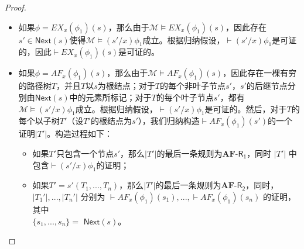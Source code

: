 \begin{proof}
\begin{itemize}
		\item 如果$\phi = EX_x(\phi_1)(s)$，那么由于$\mathcal{M}\models EX_x(\phi_1)(s)$，因此存在$s'\in \mathsf{Next}(s)$使得$\mathcal{M}\models (s'/x)\phi_1$成立。根据归纳假设，$\vdash (s'/x)\phi_1$是可证的，因此$\vdash EX_x(\phi_1)(s)$是可证的。
		\item 如果$\phi = AF_x(\phi_1)(s)$，那么由于$\mathcal{M}\models AF_x(\phi_1)(s)$，因此存在一棵有穷的路径树$T$，并且$T$以$s$为根结点；对于$T$的每个非叶子节点$s'$，$s'$的后继节点分别由$\mathsf{Next}(s)$中的元素所标记；对于$T$的每个叶子节点$s'$，都有$\mathcal{M}\models (s'/x)\phi_1$成立。根据归纳假设，$\vdash (s'/x)\phi_1$是可证的。然后，对于$T$的每个以子树$T'$（设$T'$的根结点为$s'$），我们归纳构造$\vdash AF_x(\phi_1)(s')$的一个证明$|T'|$。构造过程如下：
		\begin{itemize}
			
			\item 如果$T'$只包含一个节点$s'$，那么$|T'|$的最后一条规则为$\mathbf{AF}$-$\mathsf{R_1}$，同时 $|T'|$ 中包含$\vdash (s'/x)\phi_1$的证明；
			
			\item 如果$T' = s'(T_1, ..., T_n)$，那么$|T'|$的最后一条规则为$\mathbf{AF}$-$\mathsf{R_2}$，同时， \\$|T_1'|,...,|T_n'|$ 分别为 $\vdash AF_x(\phi_1)(s_1), ..., \vdash AF_x(\phi_1)(s_n)$ 的证明，其中 \\$\{s_1, ..., s_n\}=$ $\mathsf{Next}(s)$。 
		\end{itemize}
		

\end{itemize}
\end{proof}
